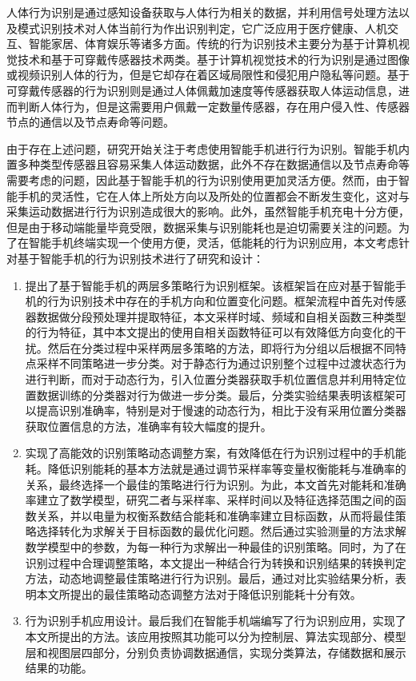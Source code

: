 ﻿
\begin{cnabstract}

\par 人体行为识别是通过感知设备获取与人体行为相关的数据，并利用信号处理方法以及模式识别技术对人体当前行为作出识别判定，它广泛应用于医疗健康、人机交互、智能家居、体育娱乐等诸多方面。传统的行为识别技术主要分为基于计算机视觉技术和基于可穿戴传感器技术两类。基于计算机视觉技术的行为识别是通过图像或视频识别人体的行为，但是它却存在着区域局限性和侵犯用户隐私等问题。基于可穿戴传感器的行为识别则是通过人体佩戴加速度等传感器获取人体运动信息，进而判断人体行为，但是这需要用户佩戴一定数量传感器，存在用户侵入性、传感器节点的通信以及节点寿命等问题。
\par 由于存在上述问题，研究开始关注于考虑使用智能手机进行行为识别。智能手机内置多种类型传感器且容易采集人体运动数据，此外不存在数据通信以及节点寿命等需要考虑的问题，因此基于智能手机的行为识别使用更加灵活方便。然而，由于智能手机的灵活性，它在人体上所处方向以及所处的位置都会不断发生变化，这对与采集运动数据进行行为识别造成很大的影响。此外，虽然智能手机充电十分方便，但是由于移动端能量毕竟受限，数据采集与识别能耗也是迫切需要关注的问题。为了在智能手机终端实现一个使用方便，灵活，低能耗的行为识别应用，本文考虑针对基于智能手机的行为识别技术进行了研究和设计：
\begin{enumerate}
	\item 提出了基于智能手机的两层多策略行为识别框架。该框架旨在应对基于智能手机的行为识别技术中存在的手机方向和位置变化问题。框架流程中首先对传感器数据做分段预处理并提取特征，本文采样时域、频域和自相关函数三种类型的行为特征，其中本文提出的使用自相关函数特征可以有效降低方向变化的干扰。然后在分类过程中采样两层多策略的方法，即将行为分组以后根据不同特点采样不同策略进一步分类。对于静态行为通过识别整个过程中过渡状态行为进行判断，而对于动态行为，引入位置分类器获取手机位置信息并利用特定位置数据训练的分类器对行为做进一步分类。最后，分类实验结果表明该框架可以提高识别准确率，特别是对于慢速的动态行为，相比于没有采用位置分类器获取位置信息的方法，准确率有较大幅度的提升。
	\item 实现了高能效的识别策略动态调整方案，有效降低在行为识别过程中的手机能耗。降低识别能耗的基本方法就是通过调节采样率等变量权衡能耗与准确率的关系，最终选择一个最佳的策略进行行为识别。为此，本文首先对能耗和准确率建立了数学模型，研究二者与采样率、采样时间以及特征选择范围之间的函数关系，并以电量为权衡系数结合能耗和准确率建立目标函数，从而将最佳策略选择转化为求解关于目标函数的最优化问题。然后通过实验测量的方法求解数学模型中的参数，为每一种行为求解出一种最佳的识别策略。同时，为了在识别过程中合理调整策略，本文提出一种结合行为转换和识别结果的转换判定方法，动态地调整最佳策略进行行为识别。最后，通过对比实验结果分析，表明本文所提出的最佳策略动态调整方法对于降低识别能耗十分有效。
	\item 行为识别手机应用设计。最后我们在智能手机端编写了行为识别应用，实现了本文所提出的方法。该应用按照其功能可以分为控制层、算法实现部分、模型层和视图层四部分，分别负责协调数据通信，实现分类算法，存储数据和展示结果的功能。
\end{enumerate}

\end{cnabstract}

